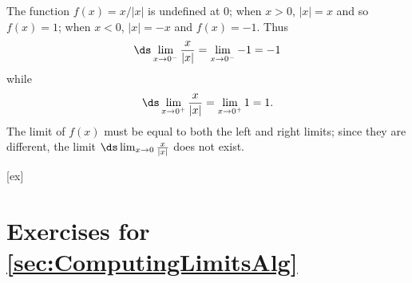 \begin{solution} 
The function $f(x)=x/|x|$ is undefined at 0; when $x>0$, $|x|=x$ and
so $f(x)=1$; when $x<0$, $|x|=-x$ and $f(x)=-1$. Thus
$$\ds \lim_{x\to 0^-}{x\over|x|}=\lim_{x\to 0^-}-1=-1$$
while 
$$\ds \lim_{x\to 0^+}{x\over|x|}=\lim_{x\to 0^+}1=1.$$
The limit of $f(x)$ must be equal to both the left and right limits; since they are
different, the limit $\ds \lim_{x\to 0}{x\over|x|}$ does not exist.
\end{solution}


[ex]
\section*{Exercises for \ref{sec:ComputingLimitsAlg}}

